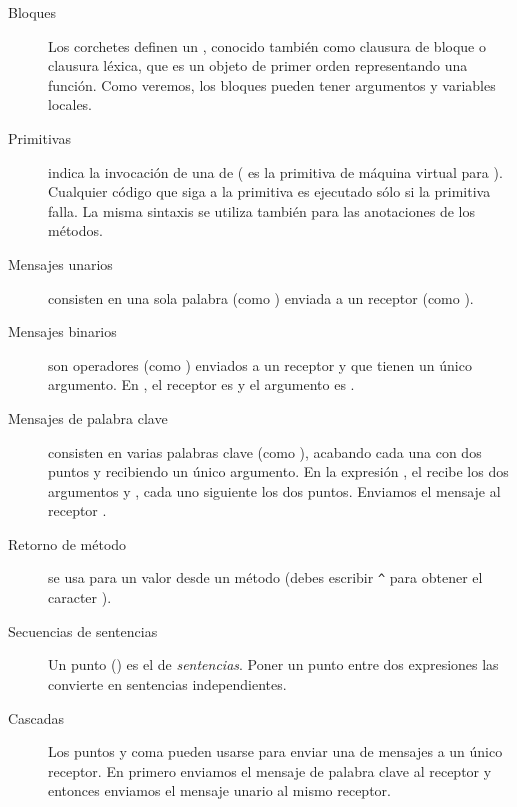 \documentclass[a4paper,10pt,twoside]{book}
\begin{document}
\begin{description}
\item[Bloques] Los corchetes \ct{[ ]} definen un , conocido también como clausura de bloque o clausura léxica, que es un objeto de primer orden representando una función. Como veremos, los bloques pueden tener argumentos y variables locales.

\item[Primitivas]  indica la invocación de una  de 
	( es la primitiva de máquina virtual para ).
	Cualquier código que siga a la primitiva es ejecutado sólo si la primitiva falla.
	La misma sintaxis se utiliza también para las anotaciones de los métodos.

\item[Mensajes unarios] consisten en una sola palabra (como ) enviada a un receptor (como ).

\item[Mensajes binarios] son operadores (como \ct{+}) enviados a un receptor y que tienen un único argumento. En , el receptor es  y el argumento es .

\item[Mensajes de palabra clave] consisten en varias palabras clave (como ), acabando cada una con dos puntos y recibiendo un único argumento.
En la expresión , el   recibe los dos argumentos  y , cada uno siguiente los dos puntos. Enviamos el mensaje al receptor .

\item[Retorno de método] \ct{^} se usa para  un valor desde un método (debes escribir \verb|^| para obtener el caracter \ct{^}).

\item[Secuencias de sentencias]	Un punto () es el  de \emph{sentencias}. Poner un punto entre dos expresiones las convierte en sentencias independientes.

\item[Cascadas] Los puntos y coma pueden usarse para enviar una  de mensajes a un único receptor.  En  primero enviamos el mensaje de palabra clave  al receptor  y entonces enviamos el mensaje unario  al mismo receptor.

\end{description}
\end{document}

